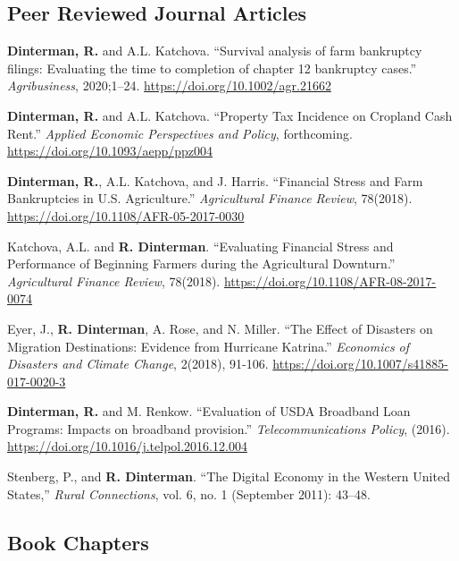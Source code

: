 \documentclass[letterpaper]{article}
\renewenvironment{itemize}{
  \begin{list}{}{
    \setlength{\leftmargin}{1.5em}
  }
}{
  \end{list}
}
\begin{document}
\subsection*{Peer Reviewed Journal Articles}
\begin{itemize}
\item \textbf{Dinterman, R.} and A.L. Katchova. ``Survival analysis of farm bankruptcy filings: Evaluating the time to completion of chapter 12 bankruptcy cases.'' \emph{Agribusiness}, 2020;1–24. \href{https://doi.org/10.1002/agr.21662}{https://doi.org/10.1002/agr.21662}
\item \textbf{Dinterman, R.} and A.L. Katchova. ``Property Tax Incidence on Cropland Cash Rent.'' \emph{Applied Economic Perspectives and Policy}, forthcoming. \href{https://doi.org/10.1093/aepp/ppz004}{https://doi.org/10.1093/aepp/ppz004}
\item \textbf{Dinterman, R.}, A.L. Katchova, and J. Harris. ``Financial Stress and Farm Bankruptcies in U.S. Agriculture.'' \emph{Agricultural Finance Review}, 78(2018). \href{https://doi.org/10.1108/AFR-05-2017-0030}{https://doi.org/10.1108/AFR-05-2017-0030}
\item Katchova, A.L. and \textbf{R. Dinterman}. ``Evaluating Financial Stress and Performance of Beginning Farmers during the Agricultural Downturn.'' \emph{Agricultural Finance Review}, 78(2018). \href{https://doi.org/10.1108/AFR-08-2017-0074}{https://doi.org/10.1108/AFR-08-2017-0074}
\item Eyer, J., \textbf{R. Dinterman}, A. Rose, and N. Miller. ``The Effect of Disasters on Migration Destinations: Evidence from Hurricane Katrina.'' \emph{Economics of Disasters and Climate Change}, 2(2018), 91-106. \href{https://doi.org/10.1007/s41885-017-0020-3}{https://doi.org/10.1007/s41885-017-0020-3}
\item \textbf{Dinterman, R.} and M. Renkow. ``Evaluation of USDA Broadband Loan Programs: Impacts on broadband provision.'' \emph{Telecommunications Policy}, (2016). \href{https://doi.org/10.1016/j.telpol.2016.12.004}{https://doi.org/10.1016/j.telpol.2016.12.004}
\item Stenberg, P., and \textbf{R. Dinterman}. ``The Digital Economy in the Western United States,'' \emph{Rural Connections}, vol. 6, no. 1 (September 2011): 43--48.
\end{itemize}

\subsection*{Book Chapters}
\end{document}
